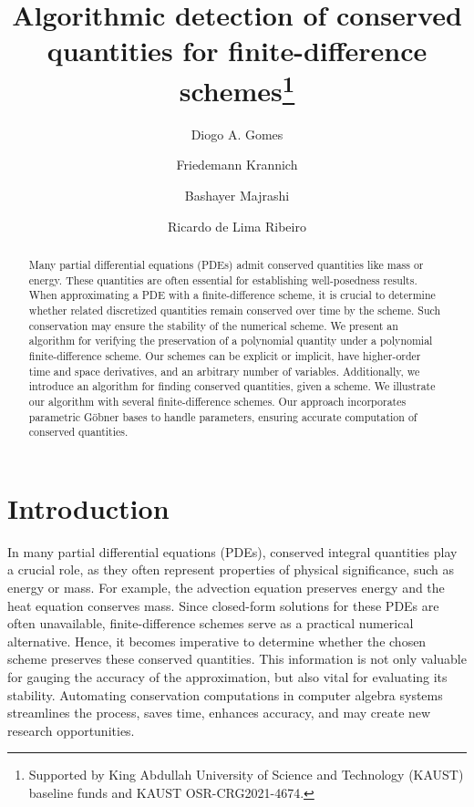 \documentclass[runningheads]{llncs}
\newcommand{\1}{\chi}
\begin{document}
%
\title{Algorithmic detection of conserved quantities for finite-difference schemes\thanks{Supported by King Abdullah University of Science and Technology (KAUST) baseline funds and KAUST OSR-CRG2021-4674.}}
%
%
\author{Diogo A. Gomes \and
	Friedemann Krannich \and
	Bashayer Majrashi \and
	Ricardo de Lima Ribeiro}
%
%
%
\maketitle
%
\begin{abstract}
	Many partial differential equations (PDEs) admit conserved quantities like mass or energy. These quantities are often essential for establishing well-posedness results. When approximating a PDE with a finite-difference scheme, it is crucial to determine whether related discretized quantities remain conserved over time by the scheme. Such conservation may ensure the stability of the numerical scheme. We present an algorithm for verifying the preservation of a polynomial quantity under a polynomial finite-difference scheme. Our schemes can be explicit or implicit, have higher-order time and space derivatives, and an arbitrary number of variables. Additionally, we introduce an algorithm for finding conserved quantities, given a scheme. We illustrate our algorithm with several finite-difference schemes. Our approach incorporates parametric G\"obner bases to handle parameters, ensuring accurate computation of conserved quantities.
	
	
\end{abstract}

\section{Introduction}
In many partial differential equations (PDEs), conserved integral quantities play a crucial role, as they often represent properties of physical significance, such as energy or mass. For example, the advection equation preserves energy and the heat equation conserves mass. 
Since closed-form solutions for these PDEs are often unavailable, finite-difference schemes serve as a practical numerical alternative. Hence, it becomes imperative to determine whether the chosen scheme preserves these conserved quantities. This information is not only valuable for gauging the accuracy of the approximation, but also vital for evaluating its stability. Automating conservation computations in computer algebra systems streamlines the process, saves time, enhances accuracy, and may create new research opportunities.
\end{document}
